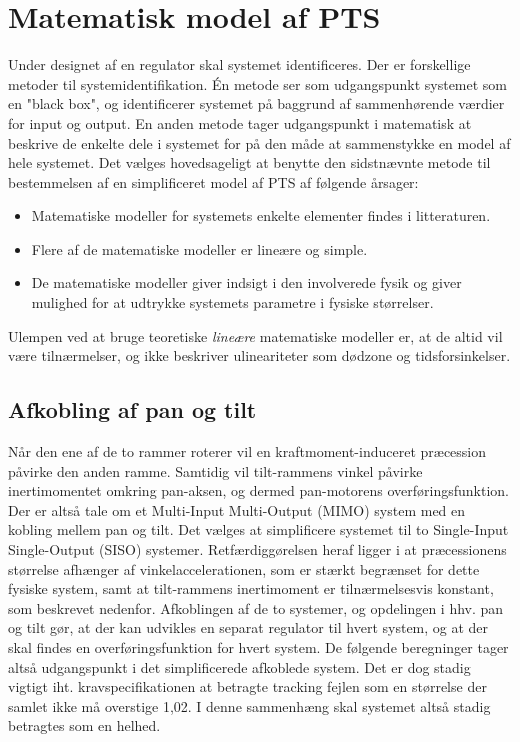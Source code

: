 \section{Matematisk model af PTS}
\label{sec:matPTS}
Under designet af en regulator skal systemet identificeres. Der er forskellige metoder til systemidentifikation.
Én metode ser som udgangspunkt systemet som en "black box", og identificerer systemet
på baggrund af sammenhørende værdier for input og output.
En anden metode tager udgangspunkt i matematisk at beskrive de enkelte dele i systemet
for på den måde at sammenstykke en model af hele systemet.
Det vælges hovedsageligt at benytte den sidstnævnte metode til bestemmelsen af en simplificeret
model af PTS af følgende årsager:
\begin{itemize}
\itemsep1pt
\item Matematiske modeller for systemets enkelte elementer findes i litteraturen.
\item Flere af de matematiske modeller er lineære og simple.
\item De matematiske modeller giver indsigt i den involverede fysik og giver mulighed
	for at udtrykke systemets parametre i fysiske størrelser.
\end{itemize}
Ulempen ved at bruge teoretiske \textit{lineære} matematiske modeller er,
at de altid vil være tilnærmelser, og ikke beskriver ulineariteter som dødzone og tidsforsinkelser.

\subsection{Afkobling af pan og tilt}
Når den ene af de to rammer roterer vil en kraftmoment-induceret præcession påvirke den anden ramme.
Samtidig vil tilt-rammens vinkel påvirke inertimomentet omkring pan-aksen, og dermed
pan-motorens overføringsfunktion.
Der er altså tale om et Multi-Input Multi-Output (MIMO) system med en kobling mellem pan og tilt.
Det vælges at simplificere systemet til to Single-Input Single-Output (SISO) systemer. %
Retfærdiggørelsen heraf ligger i at præcessionens størrelse afhænger af vinkelaccelerationen, som er stærkt begrænset
for dette fysiske system, samt at tilt-rammens inertimoment er tilnærmelsesvis konstant, som beskrevet nedenfor.
Afkoblingen af de to systemer, og opdelingen i hhv. pan og tilt gør, at der kan udvikles en separat regulator
til hvert system, og at der skal findes en overføringsfunktion for hvert system.
De følgende beregninger tager altså udgangspunkt i det simplificerede afkoblede system.
Det er dog stadig vigtigt iht. kravspecifikationen at betragte tracking fejlen som en størrelse der samlet
ikke må overstige 1,02\degree. I denne sammenhæng skal systemet altså stadig betragtes som en helhed.

